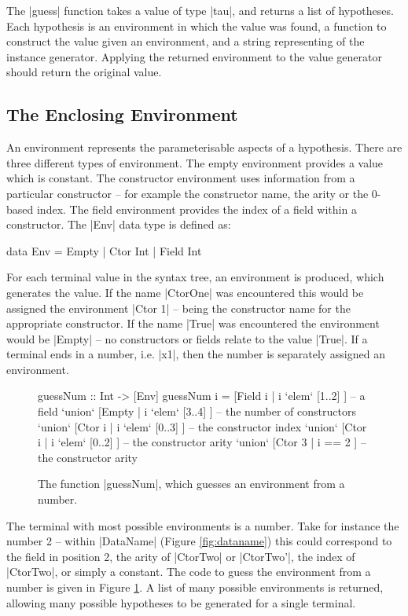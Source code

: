 \documentclass{llncs}
\begin{document}
The |guess| function takes a value of type |tau|, and returns a list of hypotheses. Each hypothesis is an environment in which the value was found, a function to construct the value given an environment, and a string representing of the instance generator. Applying the returned environment to the value generator should return the original value.


\subsection{The Enclosing Environment}
\label{sec:environment}

An environment represents the parameterisable aspects of a hypothesis. There are three different types of environment. The empty environment provides a value which is constant. The constructor environment uses information from a particular constructor -- for example the constructor name, the arity or the 0-based index. The field environment provides the index of a field within a constructor. The |Env| data type is defined as:

\begin{code}
data Env = Empty | Ctor Int | Field Int
\end{code}

For each terminal value in the syntax tree, an environment is produced, which generates the value. If the name |CtorOne| was encountered this would be assigned the environment |Ctor 1| -- being the constructor name for the appropriate constructor. If the name |True| was encountered the environment would be |Empty| -- no constructors or fields relate to the value |True|. If a terminal ends in a number, i.e. |x1|, then the number is separately assigned an environment.

\begin{figure}[t]
\begin{code}
guessNum :: Int -> [Env]
guessNum i  =        [Field i  | i `elem` [1..2]  ]  -- a field
            `union`  [Empty    | i `elem` [3..4]  ]  -- the number of constructors
            `union`  [Ctor i   | i `elem` [0..3]  ]  -- the constructor index
            `union`  [Ctor i   | i `elem` [0..2]  ]  -- the constructor arity
            `union`  [Ctor 3   | i == 2           ]  -- the constructor arity
\end{code}
\caption{The function |guessNum|, which guesses an environment from a number.}
\label{fig:guessnum}
\end{figure}

The terminal with most possible environments is a number. Take for instance the number 2 -- within |DataName| (Figure \ref{fig:dataname}) this could correspond to the field in position 2, the arity of |CtorTwo| or |CtorTwo'|, the index of |CtorTwo|, or simply a constant. The code to guess the environment from a number is given in Figure \ref{fig:guessnum}. A list of many possible environments is returned, allowing many possible hypotheses to be generated for a single terminal.
\end{document}
